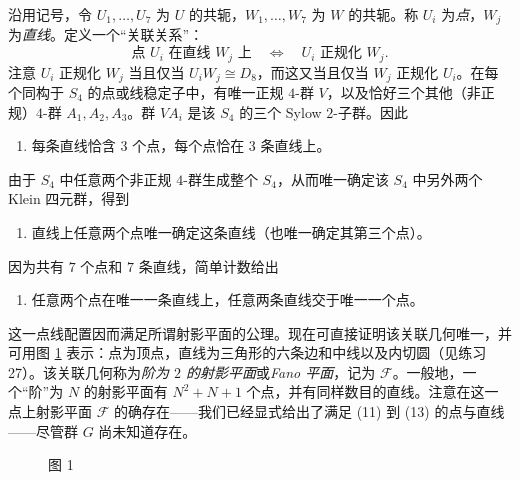 沿用记号，令 $U_1,
\ldots,U_7$ 为 $U$ 的共轭，$W_1,
\ldots,W_7$ 为 $W$ 的共轭。称 $U_i$ 为\emph{点}，$W_j$ 为\emph{直线}。定义一个“关联关系”：
\[
  \text{点 }U_i\text{ 在直线 }W_j\text{ 上}\quad\Longleftrightarrow\quad U_i\text{ 正规化 }W_j.
\]
注意 $U_i$ 正规化 $W_j$ 当且仅当 $U_iW_j\cong D_8$，而这又当且仅当 $W_j$ 正规化 $U_i$。在每个同构于 $S_4$ 的点或线稳定子中，有唯一正规 $4$-群 $V$，以及恰好三个其他（非正规）$4$-群 $A_1,A_2,A_3$。群 $VA_i$ 是该 $S_4$ 的三个 Sylow $2$-子群。因此
\begin{enumerate}[label=(\arabic*),resume]
  \item 每条直线恰含 $3$ 个点，每个点恰在 $3$ 条直线上。
\end{enumerate}
由于 $S_4$ 中任意两个非正规 $4$-群生成整个 $S_4$，从而唯一确定该 $S_4$ 中另外两个 Klein 四元群，得到
\begin{enumerate}[label=(\arabic*),resume]
  \item 直线上任意两个点唯一确定这条直线（也唯一确定其第三个点）。
\end{enumerate}
因为共有 $7$ 个点和 $7$ 条直线，简单计数给出
\begin{enumerate}[label=(\arabic*),resume]
  \item 任意两个点在唯一一条直线上，任意两条直线交于唯一一个点。
\end{enumerate}

这一点线配置因而满足所谓射影平面的公理。现在可直接证明该关联几何唯一，并可用图 \ref{fig:fano} 表示：点为顶点，直线为三角形的六条边和中线以及内切圆（见练习 27）。该关联几何称为\emph{阶为 $2$ 的射影平面}或\emph{Fano 平面}，记为 $\mathcal F$。一般地，一个“阶”为 $N$ 的射影平面有 $N^2+N+1$ 个点，并有同样数目的直线。注意在这一点上射影平面 $\mathcal F$ 的确存在——我们已经显式给出了满足 (11) 到 (13) 的点与直线——尽管群 $G$ 尚未知道存在。

\begin{figure}[htbp]
\centering
{}
\caption{图 1}
\label{fig:fano}
\end{figure}

